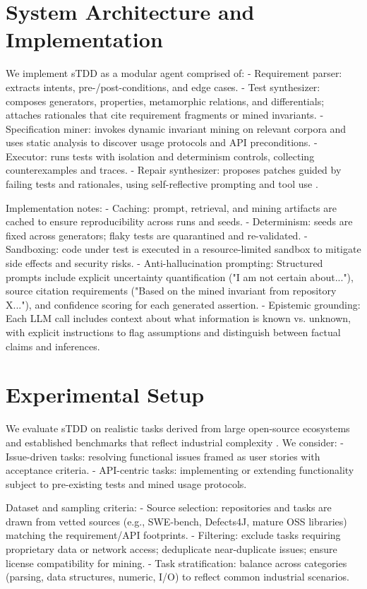 \documentclass[10pt,twocolumn]{article}
\begin{document}
\section{System Architecture and Implementation}
We implement sTDD as a modular agent comprised of:
- Requirement parser: extracts intents, pre-/post-conditions, and edge cases.
- Test synthesizer: composes generators, properties, metamorphic relations, and differentials; attaches rationales that cite requirement fragments or mined invariants.
- Specification miner: invokes dynamic invariant mining \cite{Ernst2007Daikon} on relevant corpora and uses static analysis to discover usage protocols and API preconditions.
- Executor: runs tests with isolation and determinism controls, collecting counterexamples and traces.
- Repair synthesizer: proposes patches guided by failing tests and rationales, using self-reflective prompting \cite{Shinn2023Reflexion,Madaan2023SelfRefine} and tool use \cite{Qiu2023Toolformer}.

Implementation notes:
- Caching: prompt, retrieval, and mining artifacts are cached to ensure reproducibility across runs and seeds.
- Determinism: seeds are fixed across generators; flaky tests are quarantined and re-validated.
- Sandboxing: code under test is executed in a resource-limited sandbox to mitigate side effects and security risks.
- Anti-hallucination prompting: Structured prompts include explicit uncertainty quantification ("I am not certain about..."), source citation requirements ("Based on the mined invariant from repository X..."), and confidence scoring for each generated assertion.
- Epistemic grounding: Each LLM call includes context about what information is known vs. unknown, with explicit instructions to flag assumptions and distinguish between factual claims and inferences.

\section{Experimental Setup}
We evaluate sTDD on realistic tasks derived from large open-source ecosystems and established benchmarks that reflect industrial complexity \cite{Jimenez2024SWEbench,Just2014Defects4J,Shamshiri2015EvoSuiteStudy}. We consider:
- Issue-driven tasks: resolving functional issues framed as user stories with acceptance criteria.
- API-centric tasks: implementing or extending functionality subject to pre-existing tests and mined usage protocols.

Dataset and sampling criteria:
- Source selection: repositories and tasks are drawn from vetted sources (e.g., SWE-bench, Defects4J, mature OSS libraries) matching the requirement/API footprints.
- Filtering: exclude tasks requiring proprietary data or network access; deduplicate near-duplicate issues; ensure license compatibility for mining.
- Task stratification: balance across categories (parsing, data structures, numeric, I/O) to reflect common industrial scenarios.
\end{document}
